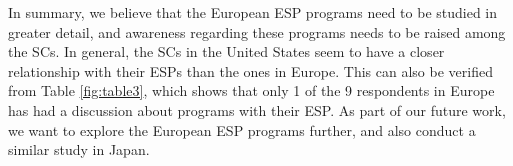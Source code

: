\documentclass{llncs}
\begin{document}
In summary, we believe that the European ESP programs need to be studied in greater detail, and awareness regarding these programs needs to be raised among the SCs. In general, the SCs in the United States seem to have a closer relationship with their ESPs than the ones in Europe. This can also be verified from Table \ref{fig:table3}, which shows that only 1 of the 9 respondents in Europe has had a discussion about programs with their ESP. As part of our future work, we want to explore the European ESP programs further, and also conduct a similar study in Japan.



\end{document}
